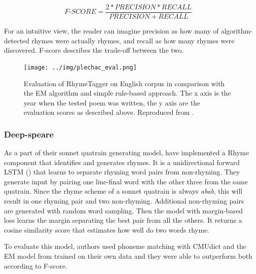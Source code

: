 \[F\textrm{-}SCORE=\frac{2*PRECISION*RECALL}{PRECISION+RECALL}\]

For an intuitive view, the reader can imagine precision as how many of algorithm-detected rhymes were actually rhymes, and recall as how many rhymes were discovered. F-score describes the trade-off between the two.

\begin{figure}[h]\centering
	\texttt{[image: ../img/plechac\_eval.png]}
	\caption[RhymeTagger evaluation]{Evaluation of RhymeTagger on English corpus in comparison with the EM algorithm and simple rule-based approach. The x axis is the year when the tested poem was written, the y axis are the evaluation scores as described above. Reproduced from \cite{plechac2017presentation}.}
	\label{screenshotRT}
\end{figure}


\subsubsection*{Deep-speare}
As a part of their \gls{sonnet} \gls{quatrain} generating model, \cite{lau2018deep} have implemented a Rhyme component that identifies and generates rhymes. It is a unidirectional forward \gls{LSTM} (\cite{hochreiter1997long}) that learns to separate rhyming word pairs from non-rhyming. They generate input by pairing one line-final word with the other three from the same quatrain. Since the rhyme scheme of a \gls{sonnet} \gls{quatrain} is always \textit{abab}, this will result in one rhyming pair and two non-rhyming. Additional non-rhyming pairs are generated with random word sampling. Then the model with margin-based loss learns the margin separating the best pair from all the others. It returns a cosine similarity score that estimates how well do two words rhyme.

To evaluate this model, authors used phoneme matching with CMUdict and the EM model from \cite{reddy2011unsupervised} trained on their own data and they were able to outperform both according to F-score.




